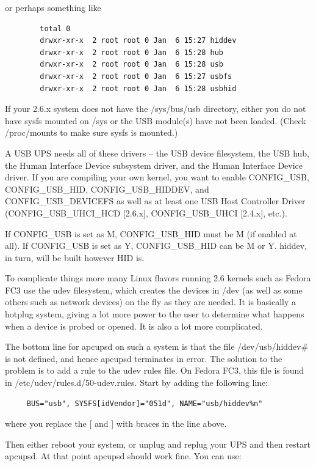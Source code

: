 or perhaps something like 

\footnotesize
\begin{verbatim}
        total 0
        drwxr-xr-x  2 root root 0 Jan  6 15:27 hiddev
        drwxr-xr-x  2 root root 0 Jan  6 15:28 hub
        drwxr-xr-x  2 root root 0 Jan  6 15:28 usb
        drwxr-xr-x  2 root root 0 Jan  6 15:27 usbfs
        drwxr-xr-x  2 root root 0 Jan  6 15:28 usbhid
\end{verbatim}
\normalsize

If your 2.6.x system does not have the /sys/bus/usb directory, either you do
not have sysfs mounted on /sys or the USB module(s) have not been loaded. 
(Check /proc/mounts to make sure sysfs is mounted.)  

A USB UPS needs all of these drivers {--} the USB device filesystem, the USB
hub, the Human Interface Device subsystem driver, and the Human Interface
Device driver. If you are compiling your own kernel, you want to enable
CONFIG\_USB, CONFIG\_USB\_HID, CONFIG\_USB\_HIDDEV, and CONFIG\_USB\_DEVICEFS
as well as at least one USB Host Controller Driver (CONFIG\_USB\_UHCI\_HCD
[2.6.x], CONFIG\_USB\_UHCI [2.4.x], etc.).  

If CONFIG\_USB is set as M, CONFIG\_USB\_HID must be M (if enabled at all). If
CONFIG\_USB is set as Y, CONFIG\_USB\_HID can be M or Y. hiddev, in turn, will
be built however HID is.  

To complicate things more many Linux flavors running 2.6 kernels such as
Fedora FC3 use the udev filesystem, which creates the devices in /dev (as well
as some others such as network devices) on the fly as they are needed. It is
basically a hotplug system, giving a lot more power to the user to determine
what happens when a device is probed or opened. It is also a lot more
complicated.  

The bottom line for apcupsd on such a system is that the file
/dev/usb/hiddev\# is not defined, and hence apcupsd terminates in error. The
solution to the problem is to add a rule to the udev rules file.  On Fedora
FC3, this file is found in /etc/udev/rules.d/50-udev.rules. Start by adding
the following line: 

\footnotesize
\begin{verbatim}
     BUS="usb", SYSFS[idVendor]="051d", NAME="usb/hiddev%n"
\end{verbatim}
\normalsize

where you replace the [ and ] with braces in the line above.  

Then either reboot your system, or unplug and replug your UPS and then restart
apcupsd. At that point apcupsd should work fine.  You can use: 

